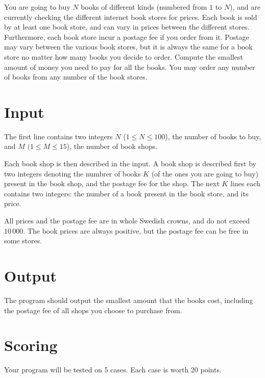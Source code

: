 You are going to buy $N$ books of different kinds (numbered from $1$ to $N$), and are currently checking the different internet book stores for prices.
Each book is sold by at least one book store, and can vary in prices between the different stores.
Furthermore, each book store incur a postage fee if you order from it.
Postage may vary between the various book stores, but it is always the same for a book store no matter how many books you decide to order.
Compute the smallest amount of money you need to pay for all the books.
You may order any number of books from any number of the book stores.

\section*{Input}
The first line contains two integers $N$ ($1 \le N \le 100$), the number of books to buy, and $M$ $(1 \le M \le 15$), the number of book shops.

Each book shop is then described in the input.
A book shop is described first by two integers denoting the numbrer of books $K$ (of the ones you are going to buy) present in the book shop, and the postage fee for the shop.
The next $K$ lines each contains two integers: the number of a book present in the book store, and its price.

All prices and the postage fee are in whole Swedish crowns, and do not exceed $10\,000$.
The book prices are always positive, but the postage fee can be free in some stores.

\section*{Output}
The program should output the smallest amount that the books cost, including the postage fee of all shops you choose to purchase from.

\section*{Scoring}
Your program will be tested on 5 cases.
Each case is worth 20 points.
